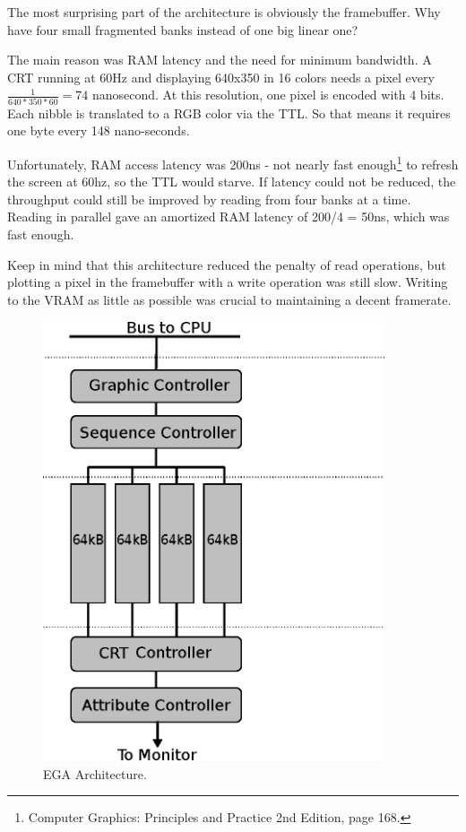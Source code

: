 \documentclass[book.tex]{subfiles}
\begin{document}
The most surprising part of the architecture is obviously the framebuffer. Why have four small fragmented banks instead of one big linear one?\\
\par
The main reason was RAM latency and the need for minimum bandwidth. A CRT running at 60Hz and displaying 640x350 in 16 colors needs a pixel every $\frac{1}{640*350*60}=74$ nanosecond. At this resolution, one pixel is encoded with 4 bits. Each nibble is translated to a RGB color via the TTL. So that means it requires one byte every 148 nano-seconds.\\
\par
 Unfortunately, RAM access latency was 200ns - not nearly fast enough\footnote{Computer Graphics: Principles and Practice 2nd Edition, page 168.} to refresh the screen at 60hz, so the TTL would starve. If latency could not be reduced, the throughput could still be improved by reading from four banks at a time. Reading in parallel gave an amortized RAM latency of 200/4 = 50ns, which was fast enough.\\
\par
Keep in mind that this architecture reduced the penalty of read operations, but plotting a pixel in the framebuffer with a write operation was still slow. Writing to the VRAM as little as possible was crucial to maintaining a decent framerate. 


\begin{figure}[H]
\centering
\includegraphics[width=0.9\textwidth]{imgs/drawings/ega.eps}
\caption{EGA Architecture.}
\label{fig:vga_arch}
\end{figure}
\end{document}
